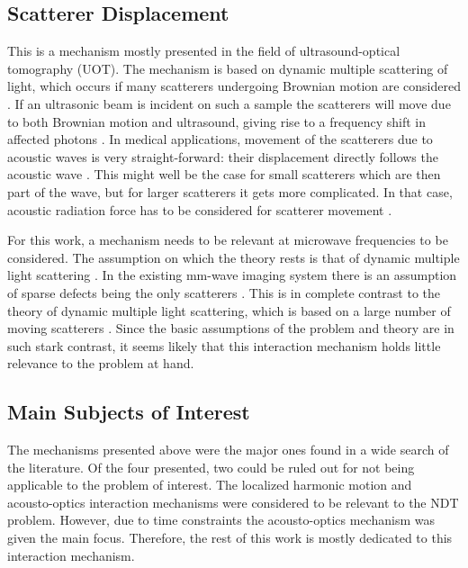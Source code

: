 \documentclass[11pt,twoside]{eitExjobb}
\begin{document}
	\subsection{Scatterer Displacement}
	This is a mechanism mostly presented in the field of ultrasound-optical tomography (UOT). The mechanism is based on dynamic multiple scattering of light, which occurs if many scatterers undergoing Brownian motion are considered \cite{Leutz1995}. If an ultrasonic beam is incident on such a sample the scatterers will move due to both Brownian motion and ultrasound, giving rise to a frequency shift in affected photons \cite{Leutz1995}\cite{Elson2011}. In medical applications, movement of the scatterers due to acoustic waves is very straight-forward: their displacement directly follows the acoustic wave \cite{Leutz1995}. This might well be the case for small scatterers which are then part of the wave, but for larger scatterers it gets more complicated. In that case, acoustic radiation force has to be considered for scatterer movement \cite{Torr1984}. 
	
	For this work, a mechanism needs to be relevant at microwave frequencies to be considered. The assumption on which the theory rests is that of dynamic multiple light scattering \cite{Leutz1995}. In the existing mm-wave imaging system there is an assumption of sparse defects being the only scatterers \cite{Helander2017}. This is in complete contrast to the theory of dynamic multiple light scattering, which is based on a large number of moving scatterers \cite{Leutz1995}. Since the basic assumptions of the problem and theory are in such stark contrast, it seems likely that this interaction mechanism holds little relevance to the problem at hand.
	
	\subsection{Main Subjects of Interest}
	The mechanisms presented above were the major ones found in a wide search of the literature. Of the four presented, two could be ruled out for not being applicable to the problem of interest. The localized harmonic motion and acousto-optics interaction mechanisms were considered to be relevant to the NDT problem. However, due to time constraints the acousto-optics mechanism was given the main focus. Therefore, the rest of this work is mostly dedicated to this interaction mechanism.
	
\end{document}
